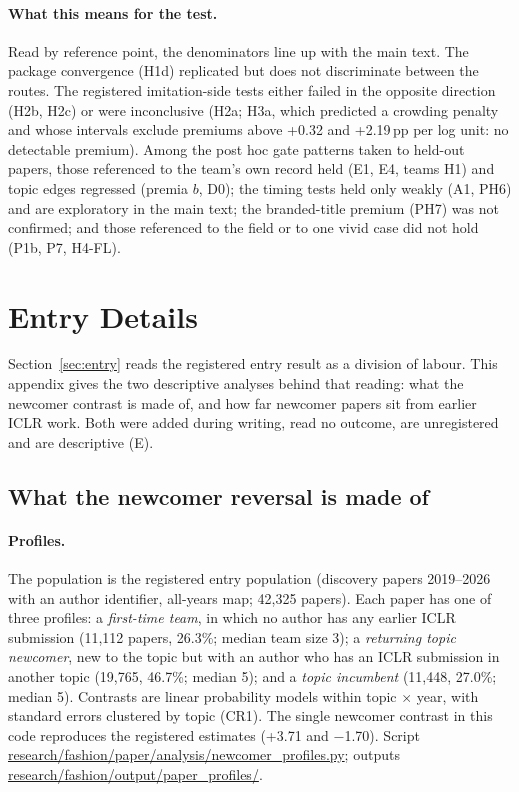 \paragraph{What this means for the test.} Read by reference point, the denominators line up with the main text. The
package convergence (H1d) replicated but does not discriminate between the routes. The registered imitation-side tests
either failed in the opposite direction (H2b, H2c) or were inconclusive (H2a; H3a, which predicted a crowding penalty
and whose intervals exclude premiums above +0.32 and +2.19\,pp per log unit: no detectable premium). Among the post
hoc gate patterns taken to held-out papers, those referenced to the team's own record held (E1, E4, teams H1) and
topic edges regressed (premia $b$, D0); the timing tests held only weakly (A1, PH6) and are exploratory in the main
text; the branded-title premium (PH7) was not confirmed; and those referenced to the field or to one vivid case did not
hold (P1b, P7, H4-FL).

\FloatBarrier
\section{Entry Details}\label{app:entry}

Section~\ref{sec:entry} reads the registered entry result as a division of labour. This appendix gives the two
descriptive analyses behind that reading: what the newcomer contrast is made of, and how far newcomer papers sit from
earlier ICLR work. Both were added during writing, read no outcome, are unregistered and are descriptive (E).

\subsection{What the newcomer reversal is made of}\label{app:profiles}

\paragraph{Profiles.} The population is the registered entry population (discovery papers 2019--2026 with an author
identifier, all-years map; 42,325 papers). Each paper has one of three profiles: a \emph{first-time team}, in which no
author has any earlier ICLR submission (11,112 papers, 26.3\%; median team size 3); a \emph{returning topic newcomer},
new to the topic but with an author who has an ICLR submission in another topic (19,765, 46.7\%; median 5); and a
\emph{topic incumbent} (11,448, 27.0\%; median 5). Contrasts are linear probability models within topic $\times$ year,
with standard errors clustered by topic (CR1). The single newcomer contrast in this code reproduces the registered
estimates (+3.71 and $-$1.70). Script \url{research/fashion/paper/analysis/newcomer_profiles.py}; outputs
\url{research/fashion/output/paper_profiles/}.

